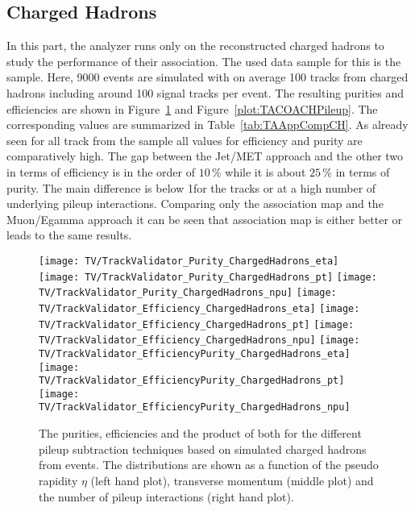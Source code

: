 

\clearpage{}


\subsection{Charged Hadrons \label{sec:TASEFRDACH}}

In this part, the analyzer runs only on the reconstructed charged hadrons to study the performance of their association. The used data sample for this is the \ttbar sample. Here, 9000 events are simulated with on average 100 tracks from charged hadrons including around 100 signal tracks per event. The resulting purities and efficiencies are shown in Figure~\ref{plot:TACOACHSignal} and Figure~\ref{plot:TACOACHPileup}. The corresponding values are summarized in Table~\ref{tab:TAAppCompCH}. As already seen for all track from the \ttbar sample all values for efficiency and purity are comparatively high. The gap between the Jet/MET approach and the other two in terms of efficiency is in the order of $10\,\%$ while it is about $25\,\%$ in terms of purity. The main difference is below 1\GeV for the tracks \pt or at a high number of underlying pileup interactions. Comparing only the association map and the Muon/Egamma approach it can be seen that association map is either better or leads to the same results.

\begin{figure}[h!t]
  \centering
  \texttt{[image: TV/TrackValidator\_Purity\_ChargedHadrons\_eta]}
  \texttt{[image: TV/TrackValidator\_Purity\_ChargedHadrons\_pt]}
  \texttt{[image: TV/TrackValidator\_Purity\_ChargedHadrons\_npu]}
  \newline
  \texttt{[image: TV/TrackValidator\_Efficiency\_ChargedHadrons\_eta]}
  \texttt{[image: TV/TrackValidator\_Efficiency\_ChargedHadrons\_pt]}
  \texttt{[image: TV/TrackValidator\_Efficiency\_ChargedHadrons\_npu]}
  \newline
  \texttt{[image: TV/TrackValidator\_EfficiencyPurity\_ChargedHadrons\_eta]}
  \texttt{[image: TV/TrackValidator\_EfficiencyPurity\_ChargedHadrons\_pt]}
  \texttt{[image: TV/TrackValidator\_EfficiencyPurity\_ChargedHadrons\_npu]}
  \caption[Purity, efficiency and their product for the different pileup subtraction techniques based on simulated charged hadrons from \ttbar events]{The purities, efficiencies and the product of both for the different pileup subtraction techniques based on simulated charged hadrons from \ttbar events. The distributions are shown as a function of the pseudo rapidity $\eta$ (left hand plot), transverse momentum (middle plot) and the number of pileup interactions (right hand plot). \label{plot:TACOACHSignal}}
\end{figure}

